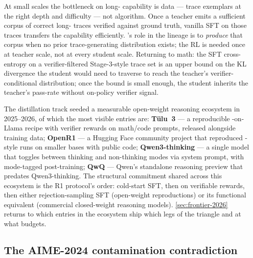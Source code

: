 \begin{intuition}
At small scales the bottleneck on long- capability is data ---
trace exemplars at the right depth and difficulty --- not algorithm.
Once a teacher emits a sufficient corpus of correct long- traces
verified against ground truth, vanilla SFT on those traces transfers
the capability efficiently. 's role in the lineage is to
\emph{produce} that corpus when no prior trace-generating
distribution exists; the RL is needed once at teacher scale, not at
every student scale. Returning to math: the SFT cross-entropy on a
verifier-filtered Stage-3-style trace set is an upper bound on the
KL divergence the student would need to traverse to reach the
teacher's verifier-conditional distribution; once the bound is small
enough, the student inherits the teacher's pass-rate without
on-policy verifier signal.
\end{intuition}

The distillation track seeded a measurable open-weight reasoning
ecosystem in 2025--2026, of which the most visible entries are:
\textbf{Tülu~3} \citep{tulu3} --- a reproducible -on-Llama
recipe with verifier rewards on math/code prompts, released alongside
training data; \textbf{OpenR1}
 --- a Hugging Face community
project that reproduced -style runs on smaller bases with
public code; \textbf{Qwen3-thinking}
 --- a single model that toggles between
thinking and non-thinking modes via system prompt, with mode-tagged
post-training; \textbf{QwQ}
 --- Qwen's standalone reasoning
preview that predates Qwen3-thinking. The structural commitment
shared across this ecosystem is the R1 protocol's order: cold-start
SFT, then  on verifiable rewards, then either rejection-sampling
SFT (open-weight reproductions) or its functional equivalent
(commercial closed-weight reasoning models). \cref{sec:frontier-2026}
returns to which entries in the ecosystem ship which legs of the
triangle and at what budgets.

\subsection{The AIME-2024 contamination contradiction}
\label{sec:r1-contamination}

